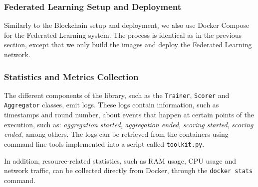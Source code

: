\subsubsection{Federated Learning Setup and Deployment}

Similarly to the Blockchain setup and deployment, we also use Docker Compose for the Federated Learning system. The process is identical as in the previous section, except that we only build the images and deploy the Federated Learning network.

\subsubsection{Statistics and Metrics Collection}

The different components of the library, such as the \texttt{Trainer}, \texttt{Scorer} and \texttt{Aggregator} classes, emit logs. These logs contain information, such as timestamps and round number, about events that happen at certain points of the execution, such as: \textit{aggregation started}, \textit{aggregation ended}, \textit{scoring started}, \textit{scoring ended}, among others. The logs can be retrieved from the containers using command-line tools implemented into a script called \texttt{toolkit.py}.

In addition, resource-related statistics, such as RAM usage, CPU usage and network traffic, can be collected directly from Docker, through the \texttt{docker stats} command.
